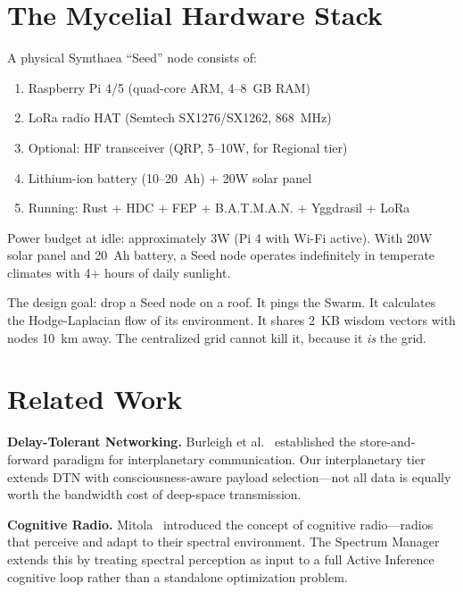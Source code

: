 \documentclass[11pt,twocolumn]{article}
\begin{document}
\section{The Mycelial Hardware Stack}

A physical Symthaea ``Seed'' node consists of:

\begin{enumerate}[nosep]
  \item Raspberry Pi 4/5 (quad-core ARM, 4--8~GB RAM)
  \item LoRa radio HAT (Semtech SX1276/SX1262, 868~MHz)
  \item Optional: HF transceiver (QRP, 5--10W, for Regional tier)
  \item Lithium-ion battery (10--20~Ah) + 20W solar panel
  \item Running: Rust + HDC + FEP + B.A.T.M.A.N. + Yggdrasil + LoRa
\end{enumerate}

Power budget at idle: approximately 3W (Pi 4 with Wi-Fi active).
With 20W solar panel and 20~Ah battery, a Seed node operates
indefinitely in temperate climates with 4+ hours of daily sunlight.

The design goal: drop a Seed node on a roof. It pings the Swarm.
It calculates the Hodge-Laplacian flow of its environment. It shares
2~KB wisdom vectors with nodes 10~km away. The centralized grid cannot
kill it, because it \emph{is} the grid.

\section{Related Work}

\textbf{Delay-Tolerant Networking.} Burleigh et al.~\cite{burleigh2003}
established the store-and-forward paradigm for interplanetary communication.
Our interplanetary tier extends DTN with consciousness-aware payload
selection---not all data is equally worth the bandwidth cost of deep-space
transmission.

\textbf{Cognitive Radio.} Mitola~\cite{mitola2000} introduced the concept
of cognitive radio---radios that perceive and adapt to their spectral
environment. The Spectrum Manager extends this by treating spectral
perception as input to a full Active Inference cognitive loop rather than
a standalone optimization problem.
\end{document}
